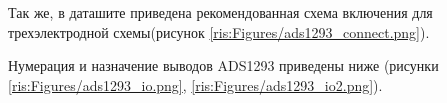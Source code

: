 

Так же, в даташите приведена рекомендованная схема включения для трехэлектродной схемы(рисунок \ref{ris:Figures/ads1293_connect.png}).




Нумерация и назначение выводов ADS1293 приведены ниже (рисунки \ref{ris:Figures/ads1293_io.png}, \ref{ris:Figures/ads1293_io2.png}).




